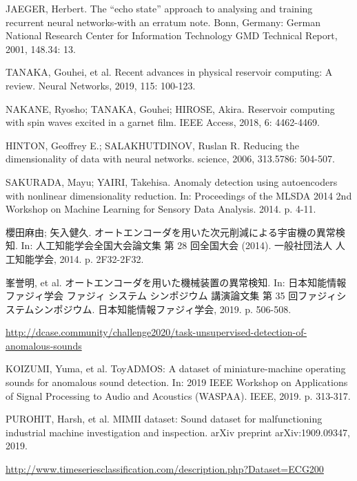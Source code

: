 \documentclass[uplatex,a4paper,10pt]{jsarticle}
\begin{document}
\newpage 
\begin{thebibliography}{99}
		
	 JAEGER, Herbert. The “echo state” approach to analysing and training recurrent neural networks-with an erratum note. Bonn, Germany: German National Research Center for Information Technology GMD Technical Report, 2001, 148.34: 13.
	
	 TANAKA, Gouhei, et al. Recent advances in physical reservoir computing: A review. Neural Networks, 2019, 115: 100-123.
	
	 NAKANE, Ryosho; TANAKA, Gouhei; HIROSE, Akira. Reservoir computing with spin waves excited in a garnet film. IEEE Access, 2018, 6: 4462-4469.
	
	 HINTON, Geoffrey E.; SALAKHUTDINOV, Ruslan R. Reducing the dimensionality of data with neural networks. science, 2006, 313.5786: 504-507.
	
	 SAKURADA, Mayu; YAIRI, Takehisa. Anomaly detection using autoencoders with nonlinear dimensionality reduction. In: Proceedings of the MLSDA 2014 2nd Workshop on Machine Learning for Sensory Data Analysis. 2014. p. 4-11.
	
	 櫻田麻由; 矢入健久. オートエンコーダを用いた次元削減による宇宙機の異常検知. In: 人工知能学会全国大会論文集 第 28 回全国大会 (2014). 一般社団法人 人工知能学会, 2014. p. 2F32-2F32.
	
	 峯誉明, et al. オートエンコーダを用いた機械装置の異常検知. In: 日本知能情報ファジィ学会 ファジィ システム シンポジウム 講演論文集 第 35 回ファジィシステムシンポジウム. 日本知能情報ファジィ学会, 2019. p. 506-508.
	    
	    \url{http://dcase.community/challenge2020/task-unsupervised-detection-of-anomalous-sounds}
	
	 KOIZUMI, Yuma, et al. ToyADMOS: A dataset of miniature-machine operating sounds for anomalous sound detection. In: 2019 IEEE Workshop on Applications of Signal Processing to Audio and Acoustics (WASPAA). IEEE, 2019. p. 313-317.
	
	 PUROHIT, Harsh, et al. MIMII dataset: Sound dataset for malfunctioning industrial machine investigation and inspection. arXiv preprint arXiv:1909.09347, 2019.
	
	    \url{http://www.timeseriesclassification.com/description.php?Dataset=ECG200}


\end{thebibliography}
\end{document}
